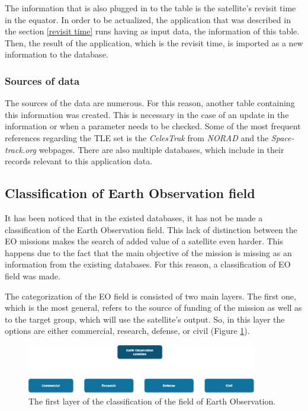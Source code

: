The information that is also plugged in to the table is the satellite's revisit time in the equator. In order to be actualized, the application that was described in the section \ref{revisit time} runs having as input data, the information of this table. Then, the result of the application, which is the revisit time, is imported as a new information to the database.

\bigskip
\subsubsection{Sources of data}
\bigskip

The sources of the data are numerous. For this reason, another table containing this information was created. This is necessary in the case of an update in the information or when a parameter needs to be checked. Some of the most frequent references regarding the TLE set is the \textit{CelesTrak} from \textit{NORAD} and the \textit{Space-track.org} webpages. There are also multiple databases, which include in their records relevant to this application data.

\bigskip
\subsection{Classification of Earth Observation field}
\bigskip

It has been noticed that in the existed databases, it has not be made a classification of the Earth Observation field. This lack of distinction between the EO missions makes the search of added value of a satellite even harder. This happens due to the fact that the main objective of the mission is missing as an information from the existing databases. For this reason, a classification of EO field was made.

The categorization of the EO field is consisted of two main layers. The first one, which is the most general, refers to the source of funding of the mission as well as to the target group, which will use the satellite's output. So, in this layer the options are either commercial, research, defense, or civil (Figure \ref{classification_1st_layer}).

\begin{figure}
\centering
\includegraphics[width=0.9\textwidth]{Images/classification_1st_layer.png}\caption{The first layer of the classification of the field of Earth Observation.}
\label{classification_1st_layer}
\end{figure}

